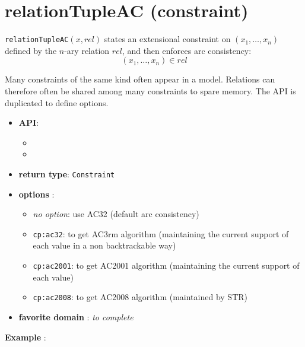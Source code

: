 \label{relationtupleac}
\hypertarget{relationtupleac}{}

\section{relationTupleAC (constraint)}\label{relationtupleac:relationtupleacconstraint}\hypertarget{relationtupleac:relationtupleacconstraint}{}
\begin{notedef}
  \texttt{relationTupleAC}$(x,rel)$ states an extensional constraint on $(x_1,\ldots,x_n)$ defined by the $n$-ary relation $rel$, and then enforces arc consistency:
$$(x_1,\ldots,x_n)\in rel$$
\end{notedef}
Many constraints of the same kind often appear in a model. Relations can therefore often be shared among many constraints to spare memory.
The API is duplicated to define options.

\begin{itemize}
	\item \textbf{API}:
	\begin{itemize}
		\item {}
		\item {}
	\end{itemize}
	\item \textbf{return type}: \texttt{Constraint}
	\item \textbf{options} :
	\begin{itemize}
		\item \emph{no option}: use AC32 (default arc consistency)
		\item \texttt{cp:ac32}: to get AC3rm algorithm (maintaining the current support of each value in a non backtrackable way)
		\item \texttt{cp:ac2001}: to get AC2001 algorithm (maintaining the current support of each value)
		\item \texttt{cp:ac2008}: to get AC2008 algorithm (maintained by STR)
	\end{itemize}
	\item \textbf{favorite domain} : \emph{to complete}
\end{itemize}

\textbf{Example} :
